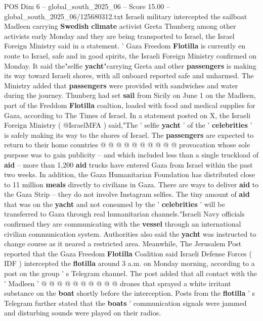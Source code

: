 \begin{textsample}{POS Dim 6 – global\_south\_2025\_06 – Score 15.00 – global\_south\_2025\_06/125680312.txt}  \label{ex:f6_pos_010}
Israeli military intercepted the sailboat Madleen carrying \textbf{Swedish} \textbf{climate} activist Greta Thunberg among other activists early Monday and they are being transported to Israel, the Israel Foreign Ministry said in a statement. ' Gaza Freedom \textbf{Flotilla} is currently en route to Israel, safe and in good spirits, the Israeli Foreign Ministry confirmed on Monday.
It said the"selfie \textbf{yacht}"carrying Greta and other \textbf{passengers} is making its way toward Israeli shores, with all onboard reported safe and unharmed.
The Ministry added that \textbf{passengers} were provided with sandwiches and water during the journey.
Thunberg had set \textbf{sail} from Sicily on June 1 on the Madleen, part of the Freddom \textbf{Flotilla} coaltion, loaded with food and medical supplies for Gaza, according to The Times of Israel.
In a statement posted on X, the Israeli Foreign Ministry ( @IsraelMFA ) said,"The ' selfie \textbf{yacht} ' of the ' \textbf{celebrities} ' is safely making its way to the shores of Israel.
The \textbf{passengers} are expected to return to their home countries @ @ @ @ @ @ @ @ @ @ provocation whose sole purpose was to gain publicity -- and which included less than a single truckload of \textbf{aid} -- more than 1,200 \textbf{aid} trucks have entered Gaza from Israel within the past two weeks.
In addition, the Gaza Humanitarian Foundation has distributed close to 11 million \textbf{meals} directly to civilians in Gaza.
There are ways to deliver \textbf{aid} to the Gaza Strip -- they do not involve Instagram selfies.
The tiny amount of \textbf{aid} that was on the \textbf{yacht} and not consumed by the ' \textbf{celebrities} ' will be transferred to Gaza through real humanitarian channels."Israeli Navy officials confirmed they are communicating with the \textbf{vessel} through an international civilian communication system.
Authorities also said the \textbf{yacht} was instructed to change course as it neared a restricted area.
Meanwhile, The Jerusalem Post reported that the Gaza Freedom \textbf{Flotilla} Coalition said Israeli Defense Forces ( IDF ) intercepted the \textbf{flotilla} around 3 a.m. on Monday morning, according to a post on the group ' s Telegram channel.
The post added that all contact with the ' Madleen ' @ @ @ @ @ @ @ @ @ @ drones that sprayed a white irritant substance on the \textbf{boat} shortly before the interception.
Posts from the \textbf{flotilla} ' s Telegram further stated that the \textbf{boats} ' communication signals were jammed and disturbing sounds were played on their radios.

\end{textsample}
